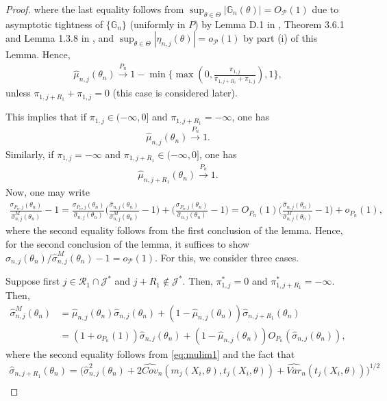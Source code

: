 \documentclass[letterpaper,11pt]{article}
\theoremstyle{myplain}
\theoremstyle{mydefinition}
\theoremstyle{myremark}
\renewcommand{\cite}{\citet}
\newcommand{\cP}{\mathcal{P}}
\numberwithin{equation}{section}
\numberwithin{figure}{section}
\begin{document}
\begin{appendices}
\begin{proof}
where the last equality follows from $\sup_{\theta\in\Theta}|\mathbb G_{n}(\theta)|=O_{\mathcal P}(1)$ due to asymptotic tightness of $\{\mathbb G_{n}\}$ (uniformly in $P$) by Lemma D.1 in \cite{BCS14_misp}, Theorem 3.6.1 and Lemma 1.3.8 in \cite{Vaart_Wellner2000aBK},  and $\sup_{\theta\in\Theta}|\eta_{n,j}(\theta)|=o_{\mathcal P}(1)$ by part (i) of this Lemma.
\color{black}
Hence, 
\begin{align}
	\hat\mu_{n,j}(\theta_n) \stackrel{P_n}{\to}1-\min\Big\{\max(0,\frac{\pi_{1,j}}{\pi_{1,j+R_1}+\pi_{1,j}}),1\Big\},
\end{align}
unless $\pi_{1,j+R_1}+\pi_{1,j}=0$ (this case is considered later). 

This implies that if $\pi_{1,j}\in(-\infty,0]$ and $\pi_{1,j+R_1}=-\infty$, one has
 \begin{align}
\hat\mu_{n,j}(\theta_n) \stackrel{P_n}{\to} 1.\label{eq:mulim1}
 \end{align}
Similarly, if $\pi_{1,j}=-\infty$ and $\pi_{1,j+R_1}\in(-\infty,0]$, one has
 \begin{align}
\hat\mu_{n,j+R_1}(\theta_n) \stackrel{P_n}{\to} 1.\label{eq:mulim2}
 \end{align}
 Now, one may write
 \begin{align}
 \frac{\sigma_{P_n,j}(\theta_n)}{\hat\sigma^M_{n,j}(\theta_n)}-1=\frac{\sigma_{P_n,j}(\theta_n)}{\hat\sigma_{n,j}(\theta_n)}\Big(\frac{\hat\sigma_{n,j}(\theta_n)}{\hat\sigma^M_{n,j}(\theta_n)}-1\Big)+\Big(\frac{\sigma_{P_n,j}(\theta_n)}{\hat\sigma_{n,j}(\theta_n)}-1\Big)=O_{P_n}(1)\Big(\frac{\hat\sigma_{n,j}(\theta_n)}{\hat\sigma^M_{n,j}(\theta_n)}-1\Big)+o_{P_n}(1),	\label{eq:sigconv1}
 \end{align}
 where the second equality follows from the first conclusion of the lemma. Hence, for the second conclusion of the lemma, it suffices to show $\hat\sigma_{n,j}(\theta_n)/\hat\sigma^M_{n,j}(\theta_n)-1=o_\cP(1).$ For this, we consider three cases. 
 
Suppose first $j\in\mathcal R_1\cap \mathcal J^*$ and $j+R_1\notin \mathcal J^*$. Then, $\pi^*_{1,j}=0$ and $\pi^*_{1,j+R_1}=-\infty$. Then, 
\begin{align}
	\hat\sigma^M_{n,j}(\theta_n)&=\hat \mu_{n,j}(\theta_n)\hat\sigma_{n,j}(\theta_n)+(1-\hat \mu_{n,j}(\theta_n))\hat\sigma_{n,j+R_1}(\theta_n)\\
	&=(1+o_{ P_n}(1))\hat\sigma_{n,j}(\theta_n)+(1-\hat \mu_{n,j}(\theta_n))O_{P_n}(\hat\sigma_{n,j}(\theta_n)),\label{eq:sigconv2}
\end{align}
where the second equality follows from \eqref{eq:mulim1} and the fact that
\begin{multline}
	\hat\sigma_{n,j+R_1}(\theta_n)=\Big(\hat\sigma_{n,j}^2(\theta_n)+2\widehat{Cov}_n(m_j(X_i,\theta),t_j(X_i,\theta))+\widehat{Var}_{n}(t_j(X_i,\theta))\Big)^{1/2}\\


\end{multline}
\end{proof}
\end{appendices}
\end{document}

